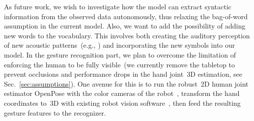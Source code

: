 As future work, we wish to investigate how the model can extract syntactic information from the observed data autonomously, thus relaxing the bag-of-word assumption in the current model.
Also, we want to add the possibility of adding new words to the vocabulary.
This involves both creating the auditory perception of new acoustic patterns~(e.g., \cite{falstrom:2017:glu, vanhainen2014:icassp, vanhainen:2012:interspeech}) and incorporating the new symbols into our \AffWords{} model.
In the gesture recognition part, we plan to overcome the limitation of enforcing the human to be fully visible~(we currently remove the tabletop to prevent occlusions and performance drops in the hand joint~3D estimation, see Sec.~\ref{sec:assumptions}).
One avenue for this is to run the robust~2D human joint estimator OpenPose with the color cameras of the robot~\cite{cao:2017:openpose-cpvr}, transform the hand coordinates to~3D with existing robot vision software~\cite{roncone:2016:rss}, then feed the resulting gesture features to the recognizer.


